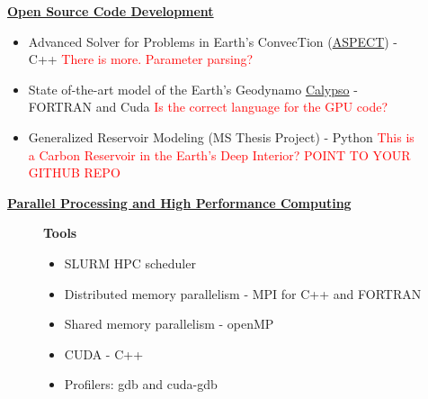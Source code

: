 \documentclass[11pt]{ltxdoc}
\begin{document}
  \begin{description}
  	
    \item[] \textbf{\underline{Open Source Code Development}}
    
      \begin{itemize}
      	
        \item Advanced Solver for Problems in Earth's ConvecTion (\href{https://github.com/geodynamics/aspect}{ASPECT}) - C++ \textcolor{red}{There is more. Parameter parsing?}
      
      \item State of-the-art model of the Earth's Geodynamo
      \href{https://geodynamics.org/cig/software/calypso/}{Calypso} - FORTRAN and Cuda
      \textcolor{red}{Is the correct language for the GPU code?}
      
      \item Generalized Reservoir Modeling (MS Thesis Project) - Python
            \textcolor{red}{This is a Carbon Reservoir in the Earth's Deep Interior? POINT TO YOUR GITHUB REPO}
            
    \end{itemize}
                                            
    \item[] \textbf{\underline{Parallel Processing and High Performance Computing}}
          
      \vskip 06pt
      
      \begin{description}
    
    	\item[] \textbf{Tools}
     
        \vskip 06pt   
        
        \begin{itemize} 
      
          \item SLURM HPC scheduler
                   
          \item Distributed memory parallelism - MPI for C++ and FORTRAN
      
          \item Shared memory parallelism - openMP
      
          \item CUDA - C++
      
          \item Profilers: gdb and cuda-gdb
      

\end{itemize}
\end{description}
\end{description}
\end{document}
